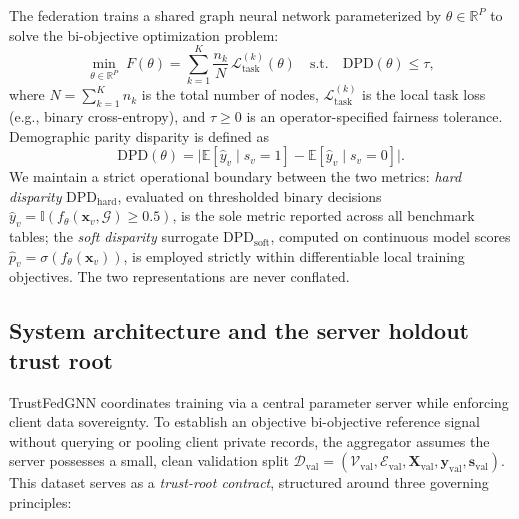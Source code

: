\documentclass[preprint,12pt]{elsarticle}
\theoremstyle{plain}
\theoremstyle{definition}
\theoremstyle{remark}
\newcommand{\dpd}{\mathrm{DPD}}
\newcommand{\R}{\mathbb{R}}
\newcommand{\E}{\mathbb{E}}
\begin{document}
The federation trains a shared graph neural network parameterized by $\theta \in \R^P$ to solve the bi-objective optimization problem:
\begin{equation}
\min_{\theta \in \R^P} \; F(\theta) = \sum_{k=1}^K \frac{n_k}{N}\, \mathcal{L}_{\mathrm{task}}^{(k)}(\theta)
\quad \text{s.t.} \quad \dpd(\theta) \le \tau ,
\label{eq:global_opt}
\end{equation}
where $N = \sum_{k=1}^K n_k$ is the total number of nodes, $\mathcal{L}_{\mathrm{task}}^{(k)}$ is the local task loss (e.g., binary cross-entropy), and $\tau \ge 0$ is an operator-specified fairness tolerance. Demographic parity disparity is defined as
\begin{equation}
\dpd(\theta) = \big\lvert \E[\hat{y}_v \mid s_v = 1] - \E[\hat{y}_v \mid s_v = 0]\big\rvert .
\label{eq:dpd_def}
\end{equation}
We maintain a strict operational boundary between the two metrics: \emph{hard disparity} $\dpd_{\mathrm{hard}}$, evaluated on thresholded binary decisions $\hat{y}_v = \mathbb{I}(f_\theta(\bm{x}_v, \mathcal{G}) \ge 0.5)$, is the sole metric reported across all benchmark tables; the \emph{soft disparity} surrogate $\dpd_{\mathrm{soft}}$, computed on continuous model scores $\hat{p}_v = \sigma(f_\theta(\bm{x}_v))$, is employed strictly within differentiable local training objectives. The two representations are never conflated.

\subsection{System architecture and the server holdout trust root}
\label{sec:holdout_assumption}
TrustFedGNN coordinates training via a central parameter server while enforcing client data sovereignty. To establish an objective bi-objective reference signal without querying or pooling client private records, the aggregator assumes the server possesses a small, clean validation split $\mathcal{D}_{\mathrm{val}} = (\mathcal{V}_{\mathrm{val}}, \mathcal{E}_{\mathrm{val}}, \bm{X}_{\mathrm{val}}, \bm{y}_{\mathrm{val}}, \bm{s}_{\mathrm{val}})$. This dataset serves as a \emph{trust-root contract}, structured around three governing principles:
\end{document}
